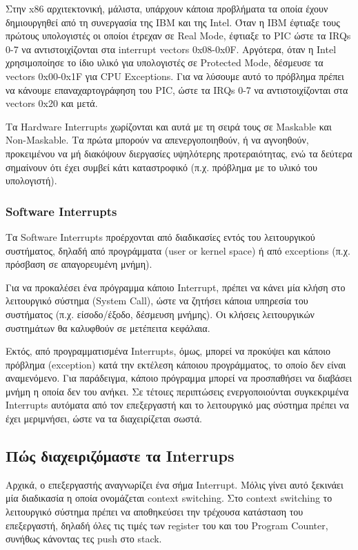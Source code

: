 \documentclass[18pt]{extarticle}
\begin{document}
Στην x86 αρχιτεκτονική, μάλιστα, υπάρχουν κάποια προβλήματα τα οποία έχουν δημιουργηθεί από τη συνεργασία της IBM και της Intel. Όταν η IBM
έφτιαξε τους πρώτους υπολογιστές οι οποίοι έτρεχαν σε Real Mode, έφτιαξε το PIC ώστε τα IRQs 0-7 να αντιστοιχίζονται στα interrupt vectors
0x08-0x0F. Αργότερα, όταν η Intel χρησιμοποίησε το ίδιο υλικό για υπολογιστές σε Protected Mode, δέσμευσε τα vectors 0x00-0x1F για CPU 
Exceptions. Για να λύσουμε αυτό το πρόβλημα πρέπει να κάνουμε επαναχαρτογράφηση του PIC, ώστε τα IRQs 0-7 να αντιστοιχίζονται στα vectors
0x20 και μετά.

Τα Hardware Interrupts χωρίζονται και αυτά με τη σειρά τους σε Maskable και Non-Maskable. Τα πρώτα μπορούν να απενεργοποιηθούν, ή να αγνοηθούν,
προκειμένου να μή διακόψουν διεργασίες υψηλότερης προτεραιότητας, ενώ τα δεύτερα σημαίνουν ότι έχει συμβεί κάτι καταστροφικό (π.χ. πρόβλημα με
το υλικό του υπολογιστή).

\subsubsection{Software Interrupts}

Τα Software Interrupts προέρχονται από διαδικασίες εντός του λειτουργικού συστήματος, δηλαδή από προγράμματα (user or kernel space) ή από
exceptions (π.χ. πρόσβαση σε απαγορευμένη μνήμη).

Για να προκαλέσει ένα πρόγραμμα κάποιο Interrupt, πρέπει να κάνει μία κλήση στο λειτουργικό σύστημα (System Call), ώστε να ζητήσει κάποια 
υπηρεσία του συστήματος (π.χ. είσοδο/έξοδο, δέσμευση μνήμης). Οι κλήσεις λειτουργικών συστημάτων θα καλυφθούν σε μετέπειτα κεφάλαια. 

Εκτός, από προγραμματισμένα Interrupts, όμως, μπορεί να προκύψει και κάποιο πρόβλημα (exception) κατά την εκτέλεση κάποιου προγράμματος,
το οποίο δεν είναι αναμενόμενο. Για παράδειγμα, κάποιο πρόγραμμα μπορεί να προσπαθήσει να διαβάσει μνήμη η οποία δεν του ανήκει. Σε τέτοιες
περιπτώσεις ενεργοποιούνται συγκεκριμένα Interrupts αυτόματα από τον επεξεργαστή και το λειτουργικό μας σύστημα πρέπει να έχει μεριμνήσει, ώστε
να τα διαχειρίζεται σωστά.

\subsection{Πώς διαχειριζόμαστε τα Interrups}
\label{int-handling}

Αρχικά, ο επεξεργαστής αναγνωρίζει ένα σήμα Interrupt. Μόλις γίνει αυτό ξεκινάει μία διαδικασία η οποία ονομάζεται context switching.
Στο context switching το λειτουργικό σύστημα πρέπει να αποθηκεύσει την τρέχουσα κατάσταση του επεξεργαστή, δηλαδή όλες τις τιμές των
register του και του Program Counter, συνήθως κάνοντας τες push στο stack.
\end{document}
